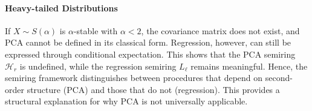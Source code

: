 \paragraph{Heavy-tailed Distributions}

If $X \sim S(\alpha)$ is $\alpha$-stable with $\alpha < 2$, the covariance matrix does not exist, and PCA cannot be defined in its classical form. Regression, however, can still be expressed through conditional expectation. This shows that the PCA semiring $\mathcal{H}_r$ is undefined, while the regression semiring $L_\ell$ remains meaningful. Hence, the semiring framework distinguishes between procedures that depend on second-order structure (PCA) and those that do not (regression). This provides a structural explanation for why PCA is not universally applicable.